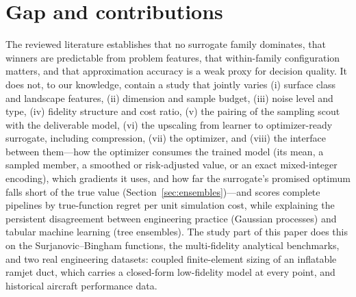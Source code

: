 \section{Gap and contributions}
\label{sec:gap}

The reviewed literature establishes that no surrogate family dominates, that winners are predictable from problem
features, that within-family configuration matters, and that approximation accuracy is a weak proxy for decision
quality. It does not, to our knowledge, contain a study that jointly varies (i) surface class and landscape features,
(ii) dimension and sample budget, (iii) noise level and type, (iv) fidelity structure and cost ratio, (v) the pairing of
the sampling scout with the deliverable model, (vi) the upscaling from learner to optimizer-ready surrogate, including
compression, (vii) the optimizer, and (viii) the interface between them---how the optimizer consumes the trained
model (its mean, a sampled member, a smoothed or risk-adjusted value, or an exact mixed-integer encoding), which
gradients it uses, and how far the surrogate's promised optimum falls short of the true value
(Section~\ref{sec:ensembles})---and scores complete pipelines by true-function regret per unit simulation cost,
while explaining the persistent disagreement between engineering practice (Gaussian processes) and tabular machine
learning (tree ensembles). The study part of this paper does this on the Surjanovic--Bingham functions, the
multi-fidelity analytical benchmarks, and two real engineering datasets: coupled finite-element sizing of an inflatable
ramjet duct, which carries a closed-form low-fidelity model at every point, and historical aircraft performance data.
